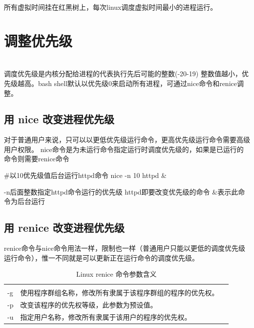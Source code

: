 所有虚拟时间挂在红黑树上，每次linux调度虚拟时间最小的进程运行。

\chapter{调整优先级}

~\\调度优先级是内核分配给进程的代表执行先后可能的整数(-20-19)
整数值越小，优先级越高。bash shell默认以优先级0来启动所有进程，可通过nice命令和renice调整。
\section{用 nice 改变进程优先级}
对于普通用户来说，只可以以更低优先级运行命令，更高优先级运行命令需要高级用户权限。
nice命令是为未运行命令指定运行时调度优先级的，如果是已运行的命令则需要renice命令
\begin{latexcmd}[label=nice命令改变进程优先级]
#以10优先级值后台运行httpd命令
nice -n 10 httpd &

-n后面整数指定httpd命令运行的优先级
httpd即要改变优先级的命令
&表示此命令为后台运行
\end{latexcmd}
\begin{tcolorbox}[colback=blue!5,colframe=blue!75!black,title=nice设置进程视频]
\end{tcolorbox}

\section{用 renice 改变进程优先级}

renice命令与nice命令用法一样，限制也一样（普通用户只能以更低的调度优先级运行命令），惟一不同就是可以更新正在运行命令的调度优先级。
\begin{table}[!htbp]
\stabbox{2.2cm}
{\caption{Linux renice 命令参数含义}\label{}}
{\begin{tabular*}{\cflwidth}{@{\hspace{5pt}}@{\extracolsep{\fill}}*{3}{@{\hspace{-3pt}}l}}
     &                \\
    -g &  使用程序群组名称，修改所有隶属于该程序群组的程序的优先权。             \\
    -p &   改变该程序的优先权等级，此参数为预设值。          \\
    -u &  指定用户名称，修改所有隶属于该用户的程序的优先权。      \\
\end{tabular*}
\floatfoot*{}
}
\end{table}

